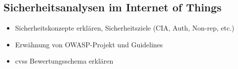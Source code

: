 \subsection{Sicherheitsanalysen im Internet of Things}
\label{sec:sota_sa}
	
	\begin{itemize}
		\item Sicherheitskonzepte erklären, Sicherheitsziele (CIA, Auth, Non-rep, etc.)
		\item Erwähnung von OWASP-Projekt und Guidelines
		\item \gls{cvss} Bewertungsschema erklären
	\end{itemize}